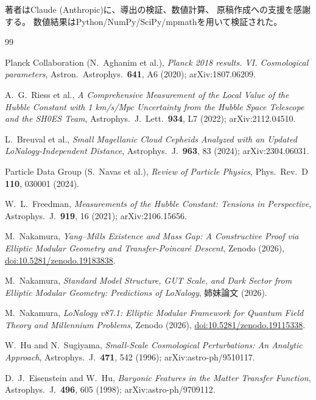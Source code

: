 \documentclass[12pt]{article}
\theoremstyle{plain}
\theoremstyle{definition}
\numberwithin{equation}{section}
\begin{document}
著者はClaude (Anthropic)に、導出の検証、数値計算、
原稿作成への支援を感謝する。
数値結果はPython/NumPy/SciPy/mpmathを用いて検証された。


\begin{thebibliography}{99}

Planck Collaboration (N.~Aghanim et al.),
\textit{Planck 2018 results. VI. Cosmological parameters},
Astron.\ Astrophys.\ \textbf{641}, A6 (2020);
arXiv:1807.06209.

A.~G.~Riess et al.,
\textit{A Comprehensive Measurement of the Local Value of the Hubble Constant
with 1 km/s/Mpc Uncertainty from the Hubble Space Telescope and the SH0ES Team},
Astrophys.\ J.\ Lett.\ \textbf{934}, L7 (2022);
arXiv:2112.04510.

L.~Breuval et al.,
\textit{Small Magellanic Cloud Cepheids Analyzed with an Updated LoNalogy-Independent
Distance},
Astrophys.\ J.\ \textbf{963}, 83 (2024);
arXiv:2304.06031.

Particle Data Group (S.~Navas et al.),
\textit{Review of Particle Physics},
Phys.\ Rev.\ D \textbf{110}, 030001 (2024).

W.~L.~Freedman,
\textit{Measurements of the Hubble Constant: Tensions in Perspective},
Astrophys.\ J.\ \textbf{919}, 16 (2021);
arXiv:2106.15656.

M.~Nakamura,
\textit{Yang--Mills Existence and Mass Gap: A Constructive Proof via
Elliptic Modular Geometry and Transfer-Poincar\'e Descent},
Zenodo (2026), \href{https://doi.org/10.5281/zenodo.19183838}{doi:10.5281/zenodo.19183838}.

M.~Nakamura,
\textit{Standard Model Structure, GUT Scale, and Dark Sector from Elliptic
Modular Geometry: Predictions of LoNalogy},
姉妹論文 (2026).

M.~Nakamura,
\textit{LoNalogy v87.1: Elliptic Modular Framework for Quantum Field Theory
and Millennium Problems},
Zenodo (2026), \href{https://doi.org/10.5281/zenodo.19115338}{doi:10.5281/zenodo.19115338}.

W.~Hu and N.~Sugiyama,
\textit{Small-Scale Cosmological Perturbations: An Analytic Approach},
Astrophys.\ J.\ \textbf{471}, 542 (1996);
arXiv:astro-ph/9510117.

D.~J.~Eisenstein and W.~Hu,
\textit{Baryonic Features in the Matter Transfer Function},
Astrophys.\ J.\ \textbf{496}, 605 (1998);
arXiv:astro-ph/9709112.

\end{thebibliography}
\end{document}
